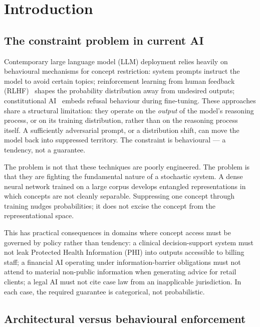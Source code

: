 \documentclass[11pt,a4paper]{article}
\theoremstyle{definition}
\begin{document}
\newpage
{\small\tableofcontents}
\bigskip

\newpage
\section{Introduction}
\label{sec:introduction}

\subsection{The constraint problem in current AI}

Contemporary large language model (LLM) deployment relies heavily on behavioural
mechanisms for concept restriction: system prompts instruct the model to avoid
certain topics; reinforcement learning from human feedback
(RLHF)~\cite{Christiano2017} shapes the probability distribution away from
undesired outputs; constitutional AI~\cite{Bai2022} embeds refusal behaviour during
fine-tuning. These approaches share a structural limitation: they operate on the
\emph{output} of the model's reasoning process, or on its training distribution,
rather than on the reasoning process itself. A sufficiently adversarial prompt, or a
distribution shift, can move the model back into suppressed territory. The constraint
is behavioural --- a tendency, not a guarantee.

The problem is not that these techniques are poorly engineered. The problem is that
they are fighting the fundamental nature of a stochastic system. A dense neural
network trained on a large corpus develops entangled representations in which
concepts are not cleanly separable. Suppressing one concept through training nudges
probabilities; it does not excise the concept from the representational space.

This has practical consequences in domains where concept access must be governed by
policy rather than tendency: a clinical decision-support system must not leak
Protected Health Information (PHI) into outputs accessible to billing staff; a
financial AI operating under information-barrier obligations must not attend to
material non-public information when generating advice for retail clients; a legal AI
must not cite case law from an inapplicable jurisdiction. In each case, the required
guarantee is categorical, not probabilistic.

\subsection{Architectural versus behavioural enforcement}
\end{document}
